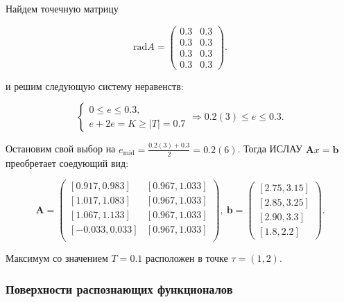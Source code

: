 \documentclass{article}
\begin{document}
  Найдем точечную матрицу

  \begin{equation*}
    \text{rad} A = \begin{pmatrix}
      0.3 & 0.3 \\
      0.3 & 0.3 \\
      0.3 & 0.3 \\
      0.3 & 0.3
    \end{pmatrix}.
  \end{equation*}

  и решим следующую систему неравенств:

  \begin{equation*}
    \begin{cases}
      0 \leqslant e \leqslant 0.3, \\
      e + 2e = K \geqslant |T| = 0.7
    \end{cases} \Rightarrow 0.2(3) \leqslant e \leqslant 0.3.
  \end{equation*}

  Остановим свой выбор на
  \( e_{\text{mid}} = \frac{0.2(3) + 0.3}{2} = 0.2(6) \). Тогда ИСЛАУ
  \( \mathbf{A}x = \mathbf{b} \) преобретает соедующий вид:

  \begin{equation*}
    \mathbf{A} = \begin{pmatrix}
      [0.917, 0.983] & [0.967, 1.033] \\
      [1.017, 1.083] & [0.967, 1.033] \\
      [1.067, 1.133] & [0.967, 1.033] \\
      [-0.033, 0.033] & [0.967, 1.033] \\
    \end{pmatrix}, \
    \mathbf{b} = \begin{pmatrix}
      [2.75, 3.15] \\
      [2.85, 3.25] \\
      [2.90, 3.3] \\
      [1.8, 2.2]
    \end{pmatrix}.
  \end{equation*}

  Максимум со значением \( T = 0.1 \) расположен в точке \( \tau = (1, 2) \).

  \clearpage

  \subsubsection{Поверхности распознающих функционалов}
\end{document}
